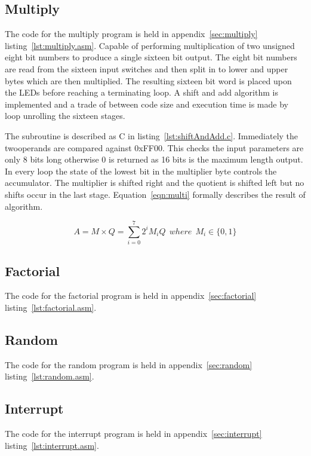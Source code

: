 \subsection{Multiply}
The code for the multiply program is held in appendix~\ref{sec:multiply} listing~\ref{lst:multiply.asm}.
Capable of performing multiplication of two unsigned eight bit numbers to produce a single sixteen bit output.
The eight bit numbers are read from the sixteen input switches and then split in to lower and upper bytes which are then multiplied.
The resulting sixteen bit word is placed upon the LEDs before reaching a terminating loop.
A shift and add algorithm is implemented and a trade of between code size and execution time is made by loop unrolling the sixteen stages.

The subroutine is described as C in listing~\ref{lst:shiftAndAdd.c}. 
Immediately the twooperands are compared against 0xFF00. 
This checks the input parameters are only 8 bits long otherwise 0 is returned as 16 bits is the maximum length output.
In every loop the state of the lowest bit in the multiplier byte controls the accumulator. 
The multiplier is shifted right and the quotient is shifted left but no shifts occur in the last stage.
Equation~\ref{eqn:multi} formally describes the result of algorithm.



\begin{equation}
   A = M \times Q = \sum_{i=0}^{7} 2^i M_i Q\:\:where\:\:M_i \in \{0,1\}
   \label{eqn:multi}
\end{equation}

\subsection{Factorial}
The code for the factorial program is held in appendix~\ref{sec:factorial} listing~\ref{lst:factorial.asm}.

\subsection{Random}
The code for the random program is held in appendix~\ref{sec:random} listing~\ref{lst:random.asm}.

\subsection{Interrupt}
The code for the interrupt program is held in appendix~\ref{sec:interrupt} listing~\ref{lst:interrupt.asm}.

